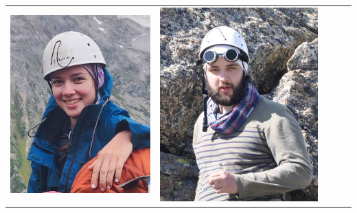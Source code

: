 \documentclass[
11pt, %
]{beamer}
\newcommand\rozhasize{0.17\textwidth}
\begin{document}
\begin{frame}
\begin{tabular}{ccccc}
\begin{minipage}{\rozhasize}
		\includegraphics[width=\textwidth]{../pics/portraits/dasha_m}
	\end{minipage} &
	\begin{minipage}{\rozhasize}
		\includegraphics[width=\textwidth]{../pics/portraits/gosha}

\end{minipage}
\end{tabular}
\end{frame}
\end{document}
